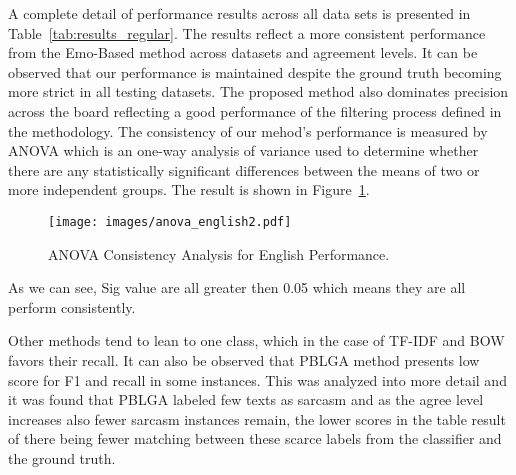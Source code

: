 \documentclass[12pt,a4paper]{report}
\theoremstyle{definition}
\begin{document}
\begin{CJK}{UTF8}{bsmi}
        \par A complete detail of performance results across all data sets is presented in Table~\ref{tab:results_regular}. The results reflect a more consistent performance from the Emo-Based method across datasets and agreement levels. It can be observed that our performance is maintained despite the ground truth becoming more strict in all testing datasets. The proposed method also dominates precision across the board reflecting a good performance of the filtering process defined in the methodology. The consistency of our mehod's performance is measured by ANOVA which is an one-way analysis of variance used to determine whether there are any statistically significant differences between the means of two or more independent groups. The result is shown in Figure~\ref{fig:anova_english}.
        \begin{center}
        \begin{figure}[H]
            \texttt{[image: images/anova\_english2.pdf]}
            \caption{ANOVA Consistency Analysis for English Performance.}
            \label{fig:anova_english}
        \end{figure}
        \end{center}
        As we can see, Sig value are all greater then 0.05 which means they are all perform consistently.
        \par Other methods tend to lean to one class, which in the case of TF-IDF and BOW favors their recall. It can also be observed that PBLGA method presents low score for F1 and recall in some instances. This was analyzed into more detail and it was found that PBLGA labeled few texts as sarcasm and as the agree level increases also fewer sarcasm instances remain, the lower scores in the table result of there being fewer matching between these scarce labels from the classifier and the ground truth.
        

\end{CJK}
\end{document}
